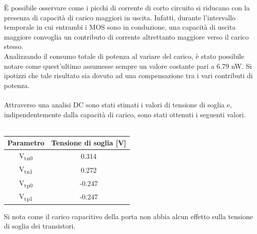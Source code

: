 \documentclass[11pt,  english, makeidx, a4paper, titlepage, oneside]{book}
\begin{document}
È possibile osservare come i picchi di corrente di corto circuito si riducano con la presenza di capacità di carico maggiori in uscita. Infatti, durante l'intervallo temporale in cui entrambi i MOS sono in conduzione, una capacità di uscita maggiore convoglia un contributo di corrente altrettanto maggiore verso il carico stesso.
\\
Analizzando il consumo totale di potenza al variare del carico, è stato possibile notare come quest'ultimo assumesse sempre un valore costante pari a 6.79 nW. Si ipotizzi che tale risultato sia dovuto ad una compensazione tra i vari contributi di potenza.
\\\\
Attraverso una analisi DC sono stati stimati i valori di tensione di soglia e, indipendentemente dalla capacità di carico, sono stati ottenuti i seguenti valori.
\\\\
\begin{center}
	\begin{tabular}{|c|c|}
	\hline
	Parametro & Tensione di soglia [V] \\
	\hline
	 V\textsubscript{tn0} & 0.314\\
	\hline
	 V\textsubscript{tn1} & 0.272 \\
	\hline
	V\textsubscript{tp0} & -0.247 \\
	\hline
	V\textsubscript{tp1} & -0.247 \\
	\hline
	\end{tabular}	
\end{center}
\vspace{0.3cm}
Si nota come il carico capacitivo della porta non abbia alcun effetto sulla tensione di soglia dei transistori.
\newpage
\end{document}
